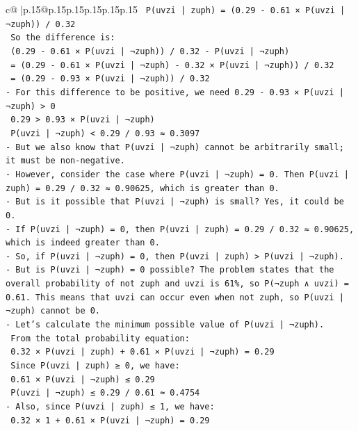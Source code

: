 \documentclass{article}
\begin{document}
{\begin{supertabular}{c@{$\;$}|p{.15\linewidth}@{}p{.15\linewidth}p{.15\linewidth}p{.15\linewidth}p{.15\linewidth}p{.15\linewidth}}
{{{\texttt{  P(uvzi | zuph) = (0.29 {-} 0.61 × P(uvzi | ¬zuph)) / 0.32} \\
\texttt{  So the difference is:} \\
\texttt{  (0.29 {-} 0.61 × P(uvzi | ¬zuph)) / 0.32 {-} P(uvzi | ¬zuph)} \\
\texttt{  = (0.29 {-} 0.61 × P(uvzi | ¬zuph) {-} 0.32 × P(uvzi | ¬zuph)) / 0.32} \\
\texttt{  = (0.29 {-} 0.93 × P(uvzi | ¬zuph)) / 0.32} \\
\texttt{{-} For this difference to be positive, we need 0.29 {-} 0.93 × P(uvzi | ¬zuph) > 0} \\
\texttt{  0.29 > 0.93 × P(uvzi | ¬zuph)} \\
\texttt{  P(uvzi | ¬zuph) < 0.29 / 0.93 ≈ 0.3097} \\
\texttt{{-} But we also know that P(uvzi | ¬zuph) cannot be arbitrarily small; it must be non{-}negative.} \\
\texttt{{-} However, consider the case where P(uvzi | ¬zuph) = 0. Then P(uvzi | zuph) = 0.29 / 0.32 ≈ 0.90625, which is greater than 0.} \\
\texttt{{-} But is it possible that P(uvzi | ¬zuph) is small? Yes, it could be 0.} \\
\texttt{{-} If P(uvzi | ¬zuph) = 0, then P(uvzi | zuph) = 0.29 / 0.32 ≈ 0.90625, which is indeed greater than 0.} \\
\texttt{{-} So, if P(uvzi | ¬zuph) = 0, then P(uvzi | zuph) > P(uvzi | ¬zuph).} \\
\texttt{{-} But is P(uvzi | ¬zuph) = 0 possible? The problem states that the overall probability of not zuph and uvzi is 61\%, so P(¬zuph ∧ uvzi) = 0.61. This means that uvzi can occur even when not zuph, so P(uvzi | ¬zuph) cannot be 0.} \\
\texttt{{-} Let's calculate the minimum possible value of P(uvzi | ¬zuph).} \\
\texttt{  From the total probability equation:} \\
\texttt{  0.32 × P(uvzi | zuph) + 0.61 × P(uvzi | ¬zuph) = 0.29} \\
\texttt{  Since P(uvzi | zuph) ≥ 0, we have:} \\
\texttt{  0.61 × P(uvzi | ¬zuph) ≤ 0.29} \\
\texttt{  P(uvzi | ¬zuph) ≤ 0.29 / 0.61 ≈ 0.4754} \\
\texttt{{-} Also, since P(uvzi | zuph) ≤ 1, we have:} \\
\texttt{  0.32 × 1 + 0.61 × P(uvzi | ¬zuph) = 0.29} \\
}}}
\end{supertabular}}
\end{document}
